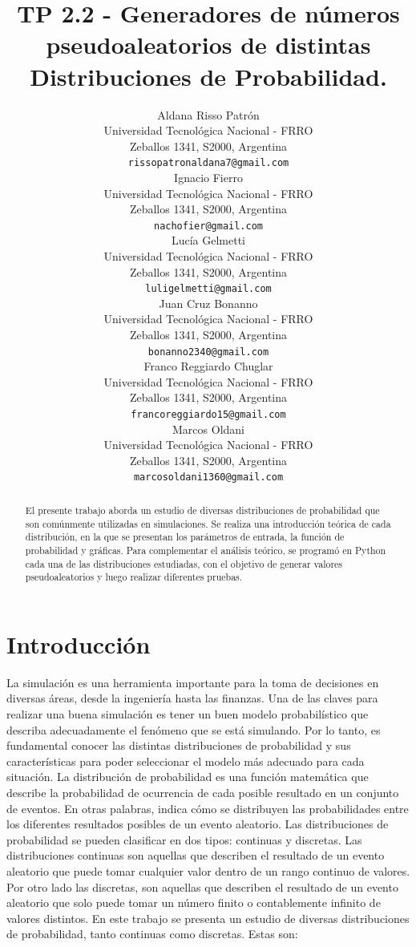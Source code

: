 \documentclass{article}
\title{TP 2.2 - Generadores de números pseudoaleatorios de distintas Distribuciones de Probabilidad.}
\author{
 Aldana Risso Patrón \\
  Universidad Tecnológica Nacional - FRRO \\
  Zeballos 1341, S2000, Argentina \\
  \texttt{rissopatronaldana7@gmail.com} \\
   \And
 Ignacio Fierro \\
  Universidad Tecnológica Nacional - FRRO \\
  Zeballos 1341, S2000, Argentina \\
  \texttt{nachofier@gmail.com} \\
  \And
 Lucía Gelmetti \\
  Universidad Tecnológica Nacional - FRRO \\
  Zeballos 1341, S2000, Argentina \\
  \texttt{luligelmetti@gmail.com} \\
  \And
 Juan Cruz Bonanno \\
  Universidad Tecnológica Nacional - FRRO \\
  Zeballos 1341, S2000, Argentina \\
  \texttt{bonanno2340@gmail.com} \\
  \And
 Franco Reggiardo Chuglar \\
  Universidad Tecnológica Nacional - FRRO\\
  Zeballos 1341, S2000, Argentina \\
  \texttt{francoreggiardo15@gmail.com} \\
  \And
 Marcos Oldani \\
  Universidad Tecnológica Nacional - FRRO \\
  Zeballos 1341, S2000, Argentina \\
  \texttt{marcosoldani1360@gmail.com} \\
}
\begin{document}
\maketitle
\begin{abstract}
El presente trabajo aborda un estudio de diversas distribuciones de probabilidad que son comúnmente
 utilizadas en simulaciones. Se realiza una introducción teórica de cada distribución, en la que se
 presentan los parámetros de entrada, la función de probabilidad y gráficas. Para complementar el
 análisis teórico, se programó en Python cada una de las distribuciones estudiadas, con el objetivo de
 generar valores pseudoaleatorios y luego realizar diferentes pruebas.
\end{abstract}

\section{Introducción}
 La simulación es una herramienta importante para la toma de decisiones en diversas áreas, desde la ingeniería hasta las finanzas. Una de las claves para realizar una buena simulación es tener un buen modelo probabilístico que describa adecuadamente el fenómeno que se está simulando. Por lo tanto, es fundamental conocer las distintas distribuciones de probabilidad y sus características para poder seleccionar el modelo más adecuado para cada situación.
 La distribución de probabilidad es una función matemática que describe la probabilidad de ocurrencia de cada posible resultado en un conjunto de eventos. En otras palabras, indica cómo se distribuyen las probabilidades entre los diferentes resultados posibles de un evento aleatorio. Las distribuciones de probabilidad se pueden clasificar en dos tipos: continuas y discretas. Las distribuciones continuas son aquellas que describen el resultado de un evento aleatorio que puede tomar cualquier valor dentro de un rango continuo de valores. Por otro lado las discretas, son aquellas que describen el resultado de un evento aleatorio que solo puede tomar un número finito o contablemente infinito de valores distintos.
 En este trabajo se presenta un estudio de diversas distribuciones de probabilidad, tanto continuas como discretas. Estas son:
\end{document}
